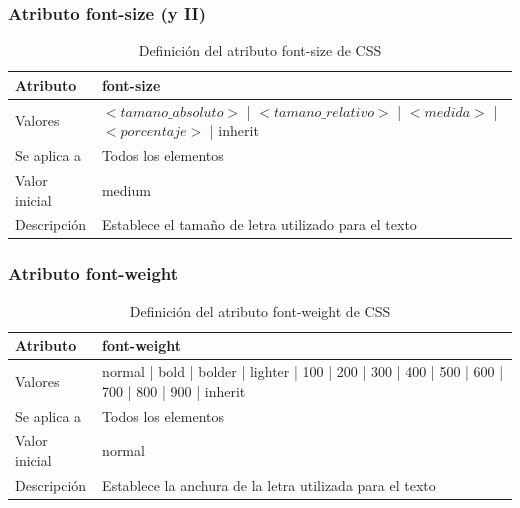 \documentclass[ucs]{beamer}
\begin{document}

\begin{frame}
\frametitle{Atributo font-size (y II)}

\begin{center}
  \begin{table}
   \begin{tabular}{p{1.8cm}p{7.8cm}}
Atributo & \bf{font-size} \\ \hline
Valores & $<tamano\_absoluto>$ | $<tamano\_relativo>$ | $<medida>$ | $<porcentaje>$ | inherit \\ \hline
Se aplica a & Todos los elementos \\ \hline
Valor inicial & medium \\ \hline
Descripción & Establece el tamaño de letra utilizado para el texto \\ \hline
  \end{tabular}
   \caption{Definición del atributo font-size de CSS}
 \end{table}
\end{center}

\end{frame}



\begin{frame}
\frametitle{Atributo font-weight}

\begin{center}
  \begin{table}
   \begin{tabular}{p{1.8cm}p{7.8cm}}
Atributo & \bf{font-weight} \\ \hline
Valores& normal | bold | bolder | lighter | 100 | 200 | 300 | 400 | 500 | 600 | 700 | 800 | 900 | inherit \\ \hline
Se aplica a& Todos los elementos \\ \hline
Valor inicial& normal \\ \hline
Descripción& Establece la anchura de la letra utilizada para el texto \\ \hline
  \end{tabular}
   \caption{Definición del atributo font-weight de CSS}
 \end{table}
\end{center}


\end{frame}


\end{document}
